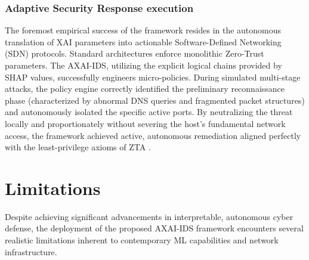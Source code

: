 \documentclass[conference]{IEEEtran}
\begin{document}
\subsubsection{Adaptive Security Response execution}
The foremost empirical success of the framework resides in the autonomous translation of XAI parameters into actionable Software-Defined Networking (SDN) protocols. Standard architectures enforce monolithic Zero-Trust parameters. The AXAI-IDS, utilizing the explicit logical chains provided by SHAP values, successfully engineers micro-policies. During simulated multi-stage attacks, the policy engine correctly identified the preliminary reconnaissance phase (characterized by abnormal DNS queries and fragmented packet structures) and autonomously isolated the specific active ports. By neutralizing the threat locally and proportionately without severing the host's fundamental network access, the framework achieved active, autonomous remediation aligned perfectly with the least-privilege axioms of ZTA \cite{alotaibi2023adaptive, chen2016xgboost}. 

\section{Limitations}

Despite achieving significant advancements in interpretable, autonomous cyber defense, the deployment of the proposed AXAI-IDS framework encounters several realistic limitations inherent to contemporary ML capabilities and network infrastructure.
\end{document}

